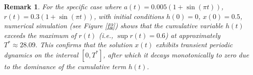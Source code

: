 \documentclass[sn-mathphys-num]{sn-jnl}
\newtheorem{example}[theorem]{Example}
\newtheorem{remark}{Remark}
\numberwithin{equation}{section}
\numberwithin{equation}{section}
\begin{document}
	\begin{remark}
		For the specific case where $a(t) = 0.005(1 + \sin(\pi t))$, $r(t) = 0.3(1 + \sin(\pi t))$, with initial conditions $h(0) = 0$, $x(0) = 0.5$, numerical simulation (see Figure \ref{f2}) shows that the cumulative variable $h(t)$ exceeds the maximum of $r(t)$ (i.e., $\sup r(t) = 0.6$) at approximately $T^* \approx 28.09.$ This confirms that the solution $x(t)$ exhibits transient periodic dynamics on the interval $[0, T^*]$, after which it decays monotonically to zero due to the dominance of the cumulative term $h(t)$.
        	\end{remark}
	
	
	
	
 
\end{document}
